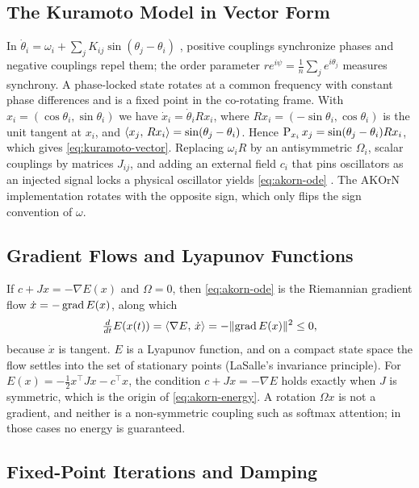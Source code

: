 \subsection{The Kuramoto Model in Vector Form}
\label{app:kuramoto}

In $\dot\theta_i=\omega_i+\sum_jK_{ij}\sin(\theta_j-\theta_i)$ \citep{kuramoto1984,strogatz2000},
positive couplings synchronize phases and negative couplings repel them; the order parameter
$re^{i\psi}=\tfrac1n\sum_je^{i\theta_j}$ measures synchrony. A phase-locked state rotates at a common
frequency with constant phase differences and is a fixed point in the co-rotating frame. With
$x_i=(\cos\theta_i,\sin\theta_i)$ we have $\dot x_i=\dot\theta_iRx_i$, where
$Rx_i=(-\sin\theta_i,\cos\theta_i)$ is the unit tangent at $x_i$, and
$\langle x_j,\, Rx_i\rangle=\sin(\theta_j-\theta_i)$. Hence $\operatorname{P}_{x_i}x_j=\sin(\theta_j-\theta_i)Rx_i$, which
gives \eqref{eq:kuramoto-vector}. Replacing $\omega_iR$ by an antisymmetric $\Omega_i$, scalar
couplings by matrices $J_{ij}$, and adding an external field $c_i$ that pins oscillators as an injected
signal locks a physical oscillator \citep{adler1946locking} yields \eqref{eq:akorn-ode}
\citep{lohe2009,miyato2025akorn}. The AKOrN implementation rotates with the opposite sign, which only
flips the sign convention of $\omega$.

\subsection{Gradient Flows and Lyapunov Functions}

If $c+Jx=-\nabla E(x)$ and $\Omega=0$, then \eqref{eq:akorn-ode} is the Riemannian gradient flow
$\dot x=-\operatorname{grad} E(x)$, along which
\begin{equation}
  \tfrac{d}{dt}E(x(t))=\langle \nabla E,\, \dot x\rangle=-\lVert \operatorname{grad} E(x)\rVert^2\le0,
\end{equation}
because $\dot x$ is tangent. $E$ is a Lyapunov function, and on a compact state space the flow
settles into the set of stationary points (LaSalle's invariance principle). For
$E(x)=-\tfrac12x^\top Jx-c^\top x$, the condition $c+Jx=-\nabla E$ holds exactly when $J$ is symmetric,
which is the origin of \eqref{eq:akorn-energy}. A rotation $\Omega x$ is not a gradient, and neither is
a non-symmetric coupling such as softmax attention; in those cases no energy is guaranteed.

\subsection{Fixed-Point Iterations and Damping}


